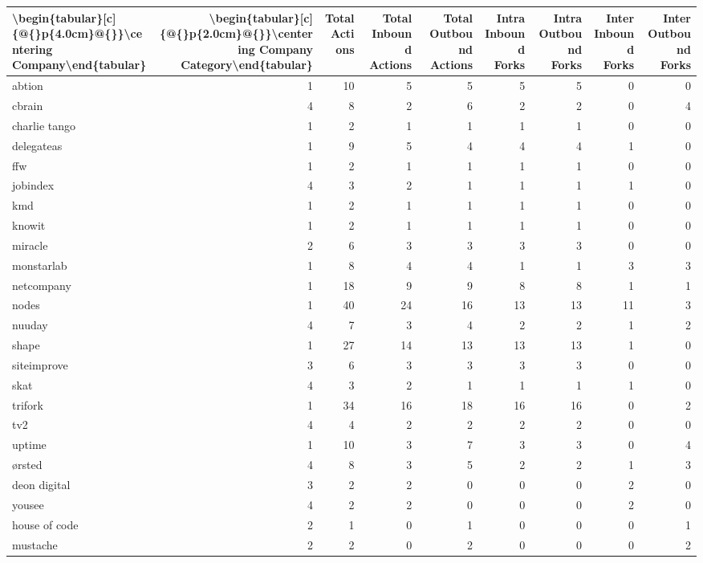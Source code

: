 \begin{tabular}{lrrrrrrrr}
\toprule
\textbackslash begin\{tabular\}[c]\{@\{\}p\{4.0cm\}@\{\}\}\textbackslash centering Company\textbackslash end\{tabular\} & \textbackslash begin\{tabular\}[c]\{@\{\}p\{2.0cm\}@\{\}\}\textbackslash centering Company Category\textbackslash end\{tabular\} & Total Actions & Total Inbound Actions & Total Outbound Actions & Intra Inbound Forks & Intra Outbound Forks & Inter Inbound Forks & Inter Outbound Forks \\
\midrule
abtion & 1 & 10 & 5 & 5 & 5 & 5 & 0 & 0 \\
cbrain & 4 & 8 & 2 & 6 & 2 & 2 & 0 & 4 \\
charlie tango & 1 & 2 & 1 & 1 & 1 & 1 & 0 & 0 \\
delegateas & 1 & 9 & 5 & 4 & 4 & 4 & 1 & 0 \\
ffw & 1 & 2 & 1 & 1 & 1 & 1 & 0 & 0 \\
jobindex & 4 & 3 & 2 & 1 & 1 & 1 & 1 & 0 \\
kmd & 1 & 2 & 1 & 1 & 1 & 1 & 0 & 0 \\
knowit & 1 & 2 & 1 & 1 & 1 & 1 & 0 & 0 \\
miracle & 2 & 6 & 3 & 3 & 3 & 3 & 0 & 0 \\
monstarlab & 1 & 8 & 4 & 4 & 1 & 1 & 3 & 3 \\
netcompany & 1 & 18 & 9 & 9 & 8 & 8 & 1 & 1 \\
nodes & 1 & 40 & 24 & 16 & 13 & 13 & 11 & 3 \\
nuuday & 4 & 7 & 3 & 4 & 2 & 2 & 1 & 2 \\
shape & 1 & 27 & 14 & 13 & 13 & 13 & 1 & 0 \\
siteimprove & 3 & 6 & 3 & 3 & 3 & 3 & 0 & 0 \\
skat & 4 & 3 & 2 & 1 & 1 & 1 & 1 & 0 \\
trifork & 1 & 34 & 16 & 18 & 16 & 16 & 0 & 2 \\
tv2 & 4 & 4 & 2 & 2 & 2 & 2 & 0 & 0 \\
uptime & 1 & 10 & 3 & 7 & 3 & 3 & 0 & 4 \\
ørsted & 4 & 8 & 3 & 5 & 2 & 2 & 1 & 3 \\
deon digital & 3 & 2 & 2 & 0 & 0 & 0 & 2 & 0 \\
yousee & 4 & 2 & 2 & 0 & 0 & 0 & 2 & 0 \\
house of code & 2 & 1 & 0 & 1 & 0 & 0 & 0 & 1 \\
mustache & 2 & 2 & 0 & 2 & 0 & 0 & 0 & 2 \\
\bottomrule
\end{tabular}
